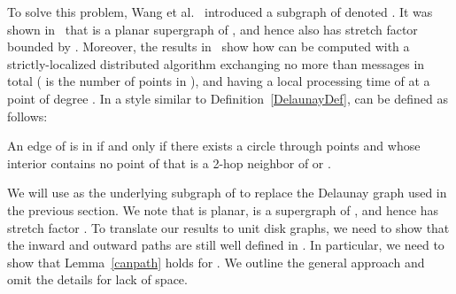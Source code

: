 \documentclass{stacs_proc}
\theoremstyle{plain}\newtheorem{satz}[thm]{Satz}
\begin{document}
To solve this problem, Wang et al.~\cite{iitunbounded1,iitunbounded}
introduced a subgraph of  denoted . It was shown
in~\cite{iitunbounded1,iitunbounded} that  is a
planar supergraph of , and hence also has stretch factor bounded
by . Moreover, the results in~\cite{gruia,iitbounded} show
how  can be computed with a strictly-localized
distributed algorithm exchanging no more than  messages in
total ( is the number of points in ), and having a local
processing time of  at a point of
degree . In a style similar to Definition~\ref{DelaunayDef},
 can be defined as follows:
\begin{definition}
\label{ldel2}
An edge  of  is in  if and only if there exists a
circle through points  and  whose interior contains no point of 
that is a 2-hop neighbor of  or .
\end{definition}
We will use  as the underlying subgraph
of  to replace the Delaunay graph  used in the previous
section. We note that  is planar, is a
supergraph of , and hence has stretch factor . To
translate our results to unit disk graphs, we need to show that the
inward and outward paths are still well defined in .
In particular, we need to show that Lemma~\ref{canpath} holds for
. We outline the general approach and omit the
details for lack of space.
\end{document}
